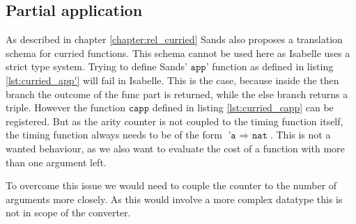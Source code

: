 \subsection{Partial application}
As described in chapter \ref{chapter:rel_curried} Sands also proposes a translation schema for curried functions.
This schema cannot be used here as Isabelle uses a strict type system.
Trying to define Sands' $\texttt{app'}$ function as defined in listing \ref{lst:curried_app'} will fail in Isabelle.
This is the case, because inside the then branch the outcome of the func part is returned, while the else branch returns a triple.
However the function $\texttt{capp}$ defined in listing \ref{lst:curried_capp} can be registered.
But as the arity counter is not coupled to the timing function itself, the timing function always needs to be of the form $\texttt{'a $\Rightarrow$ nat}$.
This is not a wanted behaviour, as we also want to evaluate the cost of a function with more than one argument left.

To overcome this issue we would need to couple the counter to the number of arguments more closely.
As this would involve a more complex datatype this is not in scope of the converter.

